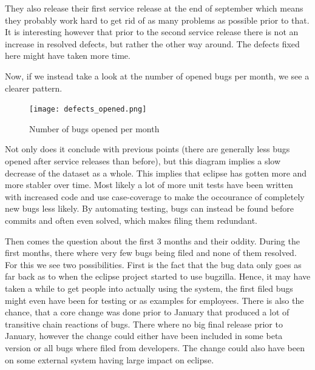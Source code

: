\documentclass{article}
\begin{document}
They also release their first service release at the end of september which means they probably work hard to get rid of as many problems as possible prior to that.%
It is interesting however that prior to the second service release there is not an increase in resolved defects, but rather the other way around. 
The defects fixed here might have taken more time.

Now, if we instead take a look at the number of opened bugs per month, we see a clearer pattern.
\begin{figure}[H]
\center
\texttt{[image: defects\_opened.png]}
\caption{Number of bugs opened per month}
\end{figure}
Not only does it conclude with previous points (there are generally less bugs opened after service releases than before), but this diagram implies a slow decrease of the dataset as a whole.
This implies that eclipse has gotten more and more stabler over time.
Most likely a lot of more unit tests have been written with increased code and use case-coverage to make the occourance of completely new bugs less likely.
By automating testing, bugs can instead be found before commits and often even solved, which makes filing them redundant.

Then comes the question about the first 3 months and their oddity.
During the first months, there where very few bugs being filed and none of them resolved.
For this we see two possibilities.
First is the fact that the bug data only goes as far back as to when the eclipse project started to use bugzilla.
Hence, it may have taken a while to get people into actually using the system, the first filed bugs might even have been for testing or as examples for employees.
There is also the chance, that a core change was done prior to January that produced a lot of transitive chain reactions of bugs.
There where no big final release prior to January, however the change could either have been included in some beta version or all bugs where filed from developers. 
The change could also have been on some external system having large impact on eclipse.

\end{document}
